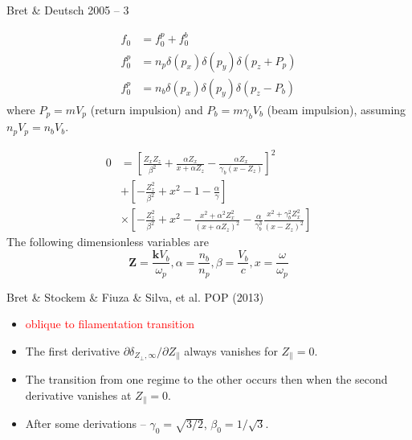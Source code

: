 \documentclass[10pt]{beamer}
\begin{document}
\begin{frame}{Bret \& Deutsch 2005 -- 3}

\begin{equation}
\begin{aligned}
    f_0 & = f_0^p + f_0^b \\
    f_0^p & = n_p\delta(p_x)\delta(p_y)\delta(p_z+P_p) \\
    f_0^p & = n_b\delta(p_x)\delta(p_y)\delta(p_z-P_b)
\end{aligned}
\end{equation}
where $P_p = mV_p$ (return impulsion) and $P_b=m\gamma_bV_b$ (beam impulsion), assuming $n_pV_p = n_bV_b$.

\begin{equation}
\begin{aligned}
0 & = \left[ \frac{Z_xZ_z}{\beta^2} + \frac{\alpha Z_x}{x+\alpha Z_z} - \frac{\alpha Z_x}{\gamma_b(x-Z_z)}  \right]^2 \\
  & + \left[ -\frac{Z_z^2}{\beta^2} + x^2 - 1 - \frac{\alpha}{\gamma}  \right] \\
  & \times \left[ -\frac{Z_z^2}{\beta^2} + x^2 - \frac{x^2+\alpha^2Z_x^2}{(x+\alpha Z_z)^2} - \frac{\alpha}{\gamma_b^3} \frac{x^2+\gamma_b^2Z_x^2}{(x-Z_z)^2} \right]
\end{aligned}
\end{equation}
The following dimensionless variables are
\begin{equation}
\bm{Z} = \frac{\bm{k}V_b}{\omega_p}, \alpha=\frac{n_b}{n_p}, \beta = \frac{V_b}{c}, x = \frac{\omega}{\omega_p}
\end{equation}
\end{frame}

\begin{frame}{Bret \& Stockem \& Fiuza \& Silva, et al. POP (2013)}
  \begin{itemize}
  \item \textcolor{red}{oblique to filamentation transition}
  \item The first derivative $\partial \delta_{Z_\perp, \infty}/\partial Z_\parallel$ always vanishes for $Z_\parallel = 0$.
  \item The transition from one regime to the other occurs then when the second derivative vanishes at $Z_\parallel = 0$.
  \item After some derivations -- $\gamma_0 = \sqrt{3/2}$, $\beta_0 = 1/\sqrt{3}$.
  \end{itemize}
\end{frame}
\end{document}
